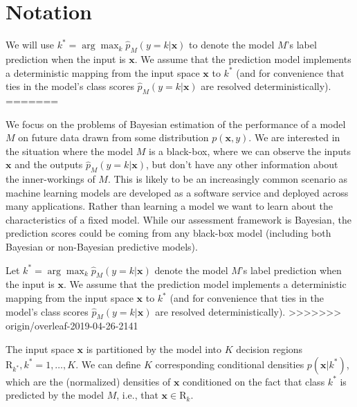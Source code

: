 \documentclass{article}
\newcommand{\ux}{{\mathbf{x}}}
\begin{document}
\section{Notation}

We will use $k^* = \arg \max_k \hat{p}_M(y = k | \ux)$ to denote the model $M$'s label prediction when the input is $\ux$.
We assume that the prediction model implements a deterministic mapping from the input space $\ux$ to $k^*$ (and for convenience that ties in the model's class scores $\hat{p}_M(y = k | \ux)$ are resolved deterministically).
=======

We focus on the problems of Bayesian estimation of the performance of a model $M$ on future data drawn from some distribution $p(\ux,y)$.
We are interested in the situation where the model $M$ is a black-box, where we can observe the inputs $\ux$ and the outputs $\hat{p}_M(y = k | \ux)$, but don't have any other information about the inner-workings of $M$. 
This is likely to be an increasingly common scenario as machine learning models are developed as a software service and deployed across many applications. Rather than learning a model we want to learn about the characteristics of a fixed model.
While our assessment framework is Bayesian, 
the prediction scores could be coming from any black-box model (including both Bayesian or non-Bayesian predictive models).

  
Let $k^* = \arg \max_k \hat{p}_M(y = k | \ux)$ denote the model $M$'s label prediction when the input is $\ux$.
We assume that the prediction model implements a deterministic mapping from the input space $\ux$ to $k^*$ (and for convenience that ties in the model's class scores $\hat{p}_M(y = k | \ux)$ are resolved deterministically).  
>>>>>>> origin/overleaf-2019-04-26-2141

The input space $\ux$ is partitioned by the model into $K$ decision regions $\mbox{R}_{k^*},  k^* = 1,\ldots,K$.
We can define $K$ corresponding conditional densities  $p(\ux | k^*)$, which are the (normalized) densities of $\ux$ conditioned on the fact that class $k^*$ is predicted by the model $M$, i.e., that $\ux \in \mbox{R}_k$.
\end{document}
